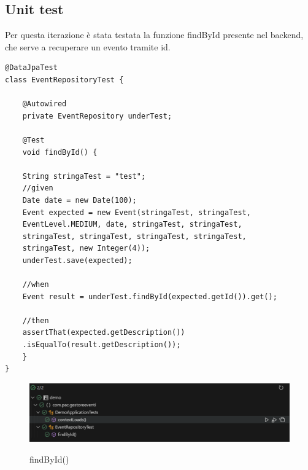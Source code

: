 \subsection{Unit test}
Per questa iterazione è stata testata la funzione findById presente nel backend, che serve a recuperare un evento tramite id.

\begin{lstlisting}
@DataJpaTest
class EventRepositoryTest {

	@Autowired
	private EventRepository underTest;
	
	@Test
	void findById() {
			
	String stringaTest = "test";
	//given
	Date date = new Date(100);
	Event expected = new Event(stringaTest, stringaTest, 
	EventLevel.MEDIUM, date, stringaTest, stringaTest, 
	stringaTest, stringaTest, stringaTest, stringaTest, 
	stringaTest, new Integer(4));
	underTest.save(expected);
	
	//when
	Event result = underTest.findById(expected.getId()).get();
	
	//then
	assertThat(expected.getDescription())
	.isEqualTo(result.getDescription());
	}
}
\end{lstlisting}

\begin{figure}[h!]
\begin{center}

  \includegraphics[width=16cm]{test/unit test/unit.PNG}\\
  \caption{findById()}
\end{center}
\end{figure}
